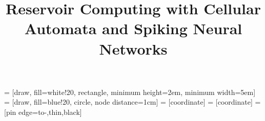 \documentclass[conference]{IEEEtran}
\begin{document}
 = [draw, fill=white!20, rectangle, 
    minimum height=2em, minimum width=5em]
 = [draw, fill=blue!20, circle, node distance=1cm]
 = [coordinate]
 = [coordinate]
 = [pin edge={to-,thin,black}]

\title{Reservoir Computing with Cellular Automata and Spiking Neural Networks}

\author{

}

\maketitle

\begin{abstract}
  \lipsum[1]
\end{abstract}











\end{document}
